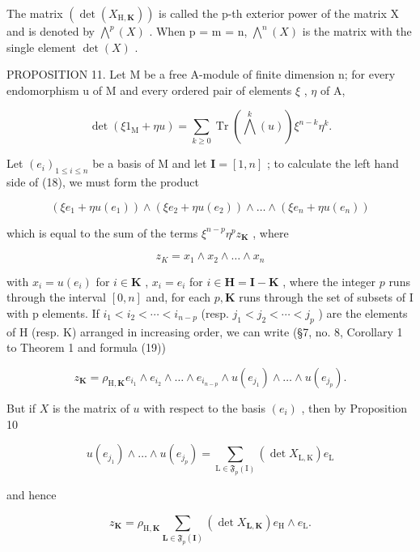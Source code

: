 The matrix \((\det(X_{\mathrm{H},\mathbf{K}}))\) is called the p-th exterior power of the matrix X and is denoted by \(\bigwedge^{p}(X)\) . When p = m = n, \(\bigwedge^{n}(X)\) is the matrix with the single element \(\det(X)\) .

PROPOSITION 11. Let M be a free A-module of finite dimension n; for every endomorphism u of M and every ordered pair of elements \(\xi\) , \(\eta\) of A,

\[
\det (\xi 1 _ {\mathrm{M}} + \eta u) = \sum_ {k \geqslant 0} \operatorname{Tr} \left(\bigwedge^ {k} (u)\right) \xi^ {n - k} \eta^ {k}.\tag{18}
\]

Let \((e_i)_{1\leqslant i\leqslant n}\) be a basis of M and let \(\mathbf{I} = [1,n]\) ; to calculate the left hand side of (18), we must form the product

\[
\left(\xi e _ {1} + \eta u (e _ {1})\right) \wedge \left(\xi e _ {2} + \eta u (e _ {2})\right) \wedge \dots \wedge \left(\xi e _ {n} + \eta u (e _ {n})\right)
\]

which is equal to the sum of the terms \(\xi^{n - p}\eta^{p}z_{\mathbf{K}}\) , where

\[
z _ {K} = x _ {1} \wedge x _ {2} \wedge \dots \wedge x _ {n}
\]

with \(x_{i} = u(e_{i})\) for \(i \in \mathbf{K}\) , \(x_{i} = e_{i}\) for \(i \in \mathbf{H} = \mathbf{I} - \mathbf{K}\) , where the integer \(p\) runs through the interval \([0, n]\) and, for each \(p, \mathbf{K}\) runs through the set of subsets of I with p elements. If \(i_{1} < i_{2} < \cdots < i_{n-p}\) (resp. \(j_{1} < j_{2} < \cdots < j_{p}\) ) are the elements of H (resp. K) arranged in increasing order, we can write (§7, no. 8, Corollary 1 to Theorem 1 and formula (19))

\[
z _ {\mathbf {K}} = \rho_ {\mathrm{H}, \mathbf {K}} e _ {i _ {1}} \wedge e _ {i _ {2}} \wedge \dots \wedge e _ {i _ {n - p}} \wedge u (e _ {j _ {1}}) \wedge \dots \wedge u (e _ {j _ {p}}).
\]

But if \(X\) is the matrix of \(u\) with respect to the basis \((e_i)\) , then by Proposition 10

\[
u (e _ {j _ {1}}) \wedge \dots \wedge u (e _ {j _ {p}}) = \sum_ {\mathrm{L} \in \mathfrak {F} _ {p} (\mathrm{I})} (\det X _ {\mathrm{L}, \mathrm{K}}) e _ {\mathrm{L}}
\]

and hence

\[
z _ {\mathbf {K}} = \rho_ {\mathrm{H}, \mathbf {K}} \sum_ {\mathbf {L} \in \mathfrak {F} _ {p} (\mathbf {I})} (\det X _ {\mathbf {L}, \mathbf {K}}) e _ {\mathrm{H}} \wedge e _ {\mathrm{L}}.
\]

